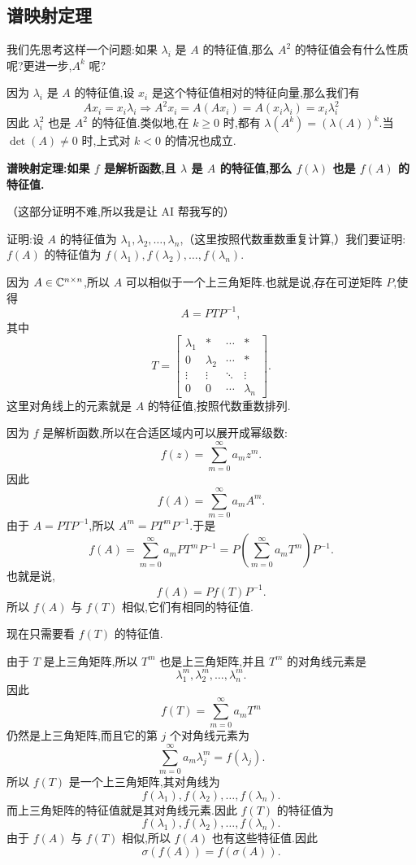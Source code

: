 \subsection{谱映射定理}

我们先思考这样一个问题:如果 $\lambda_i$ 是 $A$ 的特征值,那么 $A^2$ 的特征值会有什么性质呢?更进一步,$A^k$ 呢?

因为 $\lambda_i$ 是 $A$ 的特征值,设 $x_i$ 是这个特征值相对的特征向量,那么我们有
\[
    Ax_i = x_i\lambda_i \Rightarrow A^2x_i = A(Ax_i) = A(x_i\lambda_i) = x_i\lambda_i^2
\]
因此 $\lambda_i^2$ 也是 $A^2$ 的特征值.类似地,在 $k \ge 0$ 时,都有 $\lambda(A^k) = (\lambda(A))^k$.当 $\det(A) \ne 0$ 时,上式对 $k < 0$ 的情况也成立.

\textbf{谱映射定理:如果 $f$ 是解析函数,且 $\lambda$ 是 $A$ 的特征值,那么 $f(\lambda)$ 也是 $f(A)$ 的特征值.}

（这部分证明不难,所以我是让 AI 帮我写的）

证明:设 $A$ 的特征值为 $\lambda_1,\lambda_2,\dots,\lambda_n$,（这里按照代数重数重复计算,）我们要证明:$f(A)$ 的特征值为 $f(\lambda_1),f(\lambda_2),\dots,f(\lambda_n)$.

因为 $A \in \mathbb{C}^{n\times n}$,所以 $A$ 可以相似于一个上三角矩阵.也就是说,存在可逆矩阵 $P$,使得
\[
    A = PTP^{-1},
\]
其中
\[
    T =
    \begin{bmatrix}
        \lambda_1 & * & \cdots & * \\
        0 & \lambda_2 & \cdots & * \\
        \vdots & \vdots & \ddots & \vdots \\
        0 & 0 & \cdots & \lambda_n
    \end{bmatrix}.
\]
这里对角线上的元素就是 $A$ 的特征值,按照代数重数排列.

因为 $f$ 是解析函数,所以在合适区域内可以展开成幂级数:
\[
    f(z) = \sum_{m=0}^{\infty} a_m z^m.
\]
因此
\[
    f(A) = \sum_{m=0}^{\infty} a_m A^m.
\]
由于 $A = PTP^{-1}$,所以 $A^m = PT^mP^{-1}$.于是
\[
    f(A) = \sum_{m=0}^{\infty} a_m PT^mP^{-1} = P\left(\sum_{m=0}^{\infty} a_m T^m\right)P^{-1}.
\]
也就是说,
\[
    \boxed{f(A)=Pf(T)P^{-1}.}
\]
所以 $f(A)$ 与 $f(T)$ 相似,它们有相同的特征值.

现在只需要看 $f(T)$ 的特征值.

由于 $T$ 是上三角矩阵,所以 $T^m$ 也是上三角矩阵,并且 $T^m$ 的对角线元素是
\[
    \lambda_1^m,\lambda_2^m,\dots,\lambda_n^m.
\]
因此
\[
    f(T) = \sum_{m=0}^{\infty} a_m T^m
\]
仍然是上三角矩阵,而且它的第 $j$ 个对角线元素为
\[
    \sum_{m=0}^{\infty} a_m \lambda_j^m = f(\lambda_j).
\]
所以 $f(T)$ 是一个上三角矩阵,其对角线为
\[
    f(\lambda_1),f(\lambda_2),\dots,f(\lambda_n).
\]
而上三角矩阵的特征值就是其对角线元素.因此 $f(T)$ 的特征值为
\[
    f(\lambda_1),f(\lambda_2),\dots,f(\lambda_n).
\]
由于 $f(A)$ 与 $f(T)$ 相似,所以 $f(A)$ 也有这些特征值.因此
\[
    \boxed{\sigma(f(A)) = f(\sigma(A)).}
\]

